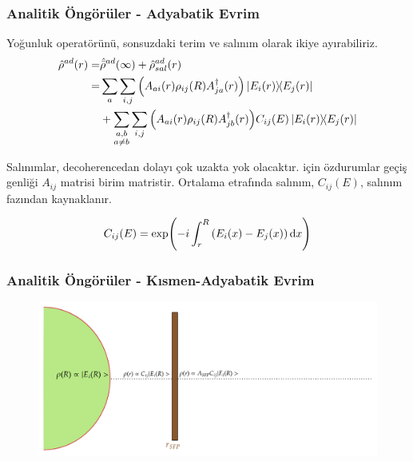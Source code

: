 \documentclass[10pt]{beamer}
\begin{document}
\begin{frame}
    \frametitle{Analitik Öngörüler - Adyabatik Evrim}
    Yoğunluk operatörünü, sonsuzdaki terim ve salınım olarak ikiye ayırabiliriz.
    \begin{align*}
        \hat{\rho}^{ad}(r) = & \hat{\bar{\rho}}^{ad}(\infty) + \hat{\rho}^{ad}_{sal}(r)\\
                      = &   \sum_{a}\sum_{i,j}\qty(A_{ai}(r) \rho_{ij}(R) A^{\dagger}_{ja}(r)) \dyad{E_{i}(r)}{E_{j}(r)} \\
                        & + \sum_{\substack{a,b\\ a \ne b}}\sum_{i,j}\qty(A_{ai}(r) \rho_{ij}(R) A^{\dagger}_{jb}(r)) C_{ij}(E) \dyad{E_{i}(r)}{E_{j}(r)}
    \end{align*}

    \begin{outline}
        \1[\textbullet] Salınımlar, decoherencedan dolayı çok uzakta yok olacaktır. 
         için özdurumlar geçiş genliği {\color{red}$ A_{ij} $ matrisi birim matristir.}
        \1[\textbullet] Ortalama etrafında salınım, $ C_{ij}(E) $, salınım fazından kaynaklanır.
    \end{outline}

    \footnotesize
    \begin{equation*}
        C_{ij}(E) = \exp(-i\int^{R}_{r} \qty(E_{i}(x)- E_{j}(x)) \dd{x})
    \end{equation*}
    \normalsize
\end{frame}

\begin{frame}
    \frametitle{Analitik Öngörüler - Kısmen-Adyabatik Evrim}
    \begin{figure}[hbt!]
        \centering
        \includegraphics[width=\textwidth]{fig/rhoSFP.png}
    \end{figure}
\end{frame}
\end{document}
